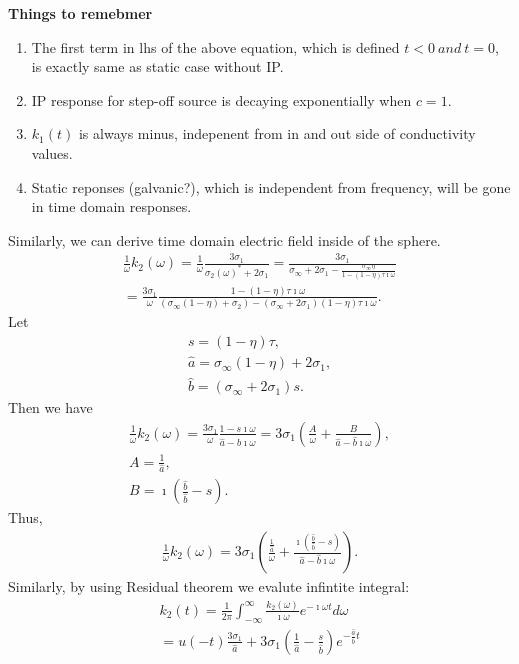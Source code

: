 \documentclass[a4paper, 11pt]{article}
\begin{document}
\textbf{Things to remebmer}
\begin{enumerate}
	\item The first term in lhs of the above equation, which is defined $t<0 \ and \ t=0$, is exactly same as static case without IP. 
	\item IP response for step-off source is decaying exponentially when $c=1$.
	\item $k_1(t)$ is always minus, indepenent from in and out side of conductivity values. 
	\item Static reponses (galvanic?), which is independent from frequency, will be gone in time domain responses. 
\end{enumerate}
Similarly, we can derive time domain electric field inside of the sphere.
\begin{align*}
	\frac{1}{\omega}k_2(\omega)=\frac{1}{\omega}\frac{3\sigma_1}{\sigma_2(\omega)^*+2\sigma_1}
			   				   =\frac{3\sigma_1}{\sigma_{\infty}+2\sigma_1-\frac{\sigma_{\infty}\eta}{1-(1-\eta)\tau\imath\omega}} \\
			   				   =\frac{3\sigma_1}{\omega}\frac{1-(1-\eta)\tau\imath\omega}{(\sigma_{\infty}(1-\eta)+\sigma_2)- (\sigma_{\infty}+2\sigma_1)(1-\eta)\tau\imath\omega}.
\end{align*}
Let
\begin{align*}
	s = (1-\eta)\tau, \\
	\hat{a} = \sigma_{\infty}(1-\eta) + 2\sigma_1, \\
	\hat{b} = (\sigma_{\infty} + 2\sigma_1)s.
\end{align*}
Then we have
\begin{align*}
	\frac{1}{\omega}k_2(\omega)=\frac{3\sigma_1}{\omega}\frac{1-s\imath\omega}{\hat{a}-\hat{b}\imath\omega}
							   = 3\sigma_1(\frac{A}{\omega}+\frac{B}{\hat{a}-\hat{b}\imath\omega}), \\
	A = \frac{1}{\hat{a}}, \\
	B = \imath(\frac{\hat{b}}{\hat{b}}-s).
\end{align*}
Thus, 
\begin{align*}
	\frac{1}{\omega}k_2(\omega)= 3\sigma_1(\frac{\frac{1}{\hat{a}}}{\omega}+\frac{\imath(\frac{\hat{b}}{\hat{b}}-s)}{\hat{a}-\hat{b}\imath\omega}).
\end{align*}
Similarly, by using Residual theorem we evalute infintite integral:
\begin{align}
	k_2(t) = \frac{1}{2\pi}\int_{-\infty}^{\infty}\frac{k_2(\omega)}{\imath\omega}e^{-\imath\omega t} d\omega \nonumber\\ 
		   = u(-t)\frac{3\sigma_1}{\hat{a}}+3\sigma_1(\frac{1}{\hat{a}}-\frac{s}{\hat{b}})e^{-\frac{\hat{a}}{\hat{b}}t}
	\label{eq:IPspheq5}				   
\end{align}
\end{document}
